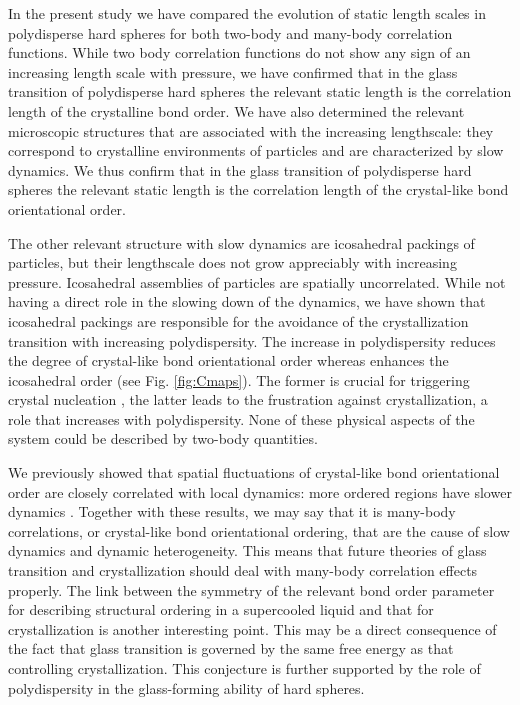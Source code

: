 \documentclass[twocolumn,superscriptaddress]{revtex4}
\begin{document}
In the present study we have compared the evolution of static length scales in polydisperse hard spheres
for both two-body and many-body correlation functions. While two body correlation functions do not
show any sign of an increasing length scale with pressure, we have confirmed that in the glass transition of polydisperse hard spheres the relevant static length is the correlation length of the crystalline bond order.
We have also determined the relevant microscopic structures that are associated with the increasing
lengthscale: they correspond to crystalline environments of particles and are characterized by slow
dynamics.
We thus confirm that in the glass transition of polydisperse hard spheres the relevant static length is the correlation length of the crystal-like bond orientational order.

The other relevant structure with slow dynamics are icosahedral packings of particles, but
their lengthscale does not grow appreciably with increasing pressure. Icosahedral assemblies of particles
are spatially uncorrelated. While not having a direct role in the slowing down of the dynamics, we
have shown that icosahedral packings are responsible for the avoidance of the crystallization transition
with increasing polydispersity.
The increase in polydispersity reduces the degree of crystal-like bond orientational order whereas enhances the icosahedral order (see Fig. \ref{fig:Cmaps}). 
The former is crucial for triggering 
crystal nucleation \cite{russo_hs}, the latter leads to the frustration against crystallization, a role that increases with polydispersity. None of these physical aspects of the system could be described by two-body quantities. 

We previously showed that spatial fluctuations of crystal-like bond orientational order are closely correlated with local dynamics: 
more ordered regions have slower dynamics \cite{KAT,WT,ShintaniNP,tanaka,Kawasaki3D,mathieu_icosahedra}. 
Together with these results, we may say that it is many-body correlations, or crystal-like bond orientational ordering, that 
are the cause of slow dynamics and dynamic heterogeneity.  
This means that future theories of glass transition and crystallization should deal with many-body correlation effects properly. 
The link between the symmetry of the relevant bond order parameter for describing structural ordering 
in a supercooled liquid and that for crystallization is another interesting point. 
This may be a direct consequence of the fact that glass transition is governed by the same free energy as that 
controlling crystallization. This conjecture is further supported by the role of 
polydispersity in the glass-forming ability of hard spheres.  
\end{document}
